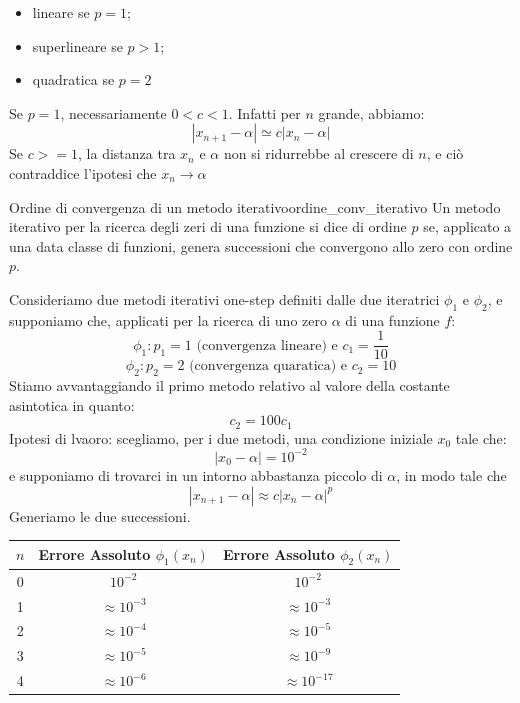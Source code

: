 \documentclass[12pt]{report}
\newcounter{definition}
\newcommand{\nmu}{}
\begin{document}
\begin{itemize}
	\item lineare se $p = 1$;
	\item superlineare se $p > 1$;
	\item quadratica se $p = 2$
\end{itemize}
\begin{note}{}{}
	Se $p = 1$, necessariamente $0 < c < 1$. Infatti per $n$ grande, abbiamo:
	\[
	|x_{n+1}-\alpha| \simeq c|x_n-\alpha|
	\]
	Se $c >=1$, la distanza tra $x_n$ e $\alpha$ non si ridurrebbe al crescere di $n$, e ciò contraddice l'ipotesi che $x_n \to \alpha$
\end{note}
\begin{definition}{\nmu Ordine di convergenza di un metodo iterativo}{ordine_conv_iterativo}
	Un metodo iterativo per la ricerca degli zeri di una funzione si dice di ordine $p$ se, applicato a una data classe di funzioni, genera successioni che convergono allo zero con ordine $p$.
\end{definition}
\begin{example}{}{}
	Consideriamo due metodi iterativi one-step definiti dalle due iteratrici $\phi_1$ e $\phi_2$, e supponiamo che, applicati per la ricerca di uno zero $\alpha$ di una funzione $f$:
	\[
	\phi_1: p_1 =1 \text{ (convergenza lineare) e } c_1 = \frac{1}{10}
	\]
	\[
	\phi_2: p_2 =2 \text{ (convergenza quaratica) e } c_2 = 10
	\]
	Stiamo avvantaggiando il primo metodo relativo al valore della costante asintotica in quanto:
	\[
	c_2 = 100c_1
	\]
	Ipotesi di lvaoro: scegliamo, per i due metodi, una condizione iniziale $x_0$ tale che:
	\[
	|x_0 - \alpha| = 10^{-2}
	\]
	e supponiamo di trovarci in un intorno abbastanza piccolo di $\alpha$, in modo tale che
	\[
	|x_{n+1} -\alpha| \approx c|x_n - \alpha|^p
	\]
	Generiamo le due successioni.
	\begin{center}
		\begin{tabular}{c|c|c}
			$n$ & \textbf{Errore Assoluto} $\phi_1(x_n)$ & \textbf{Errore Assoluto} $\phi_2(x_n)$ \\ \hline
			0 & $10^{-2}$ & $10^{-2}$ \\
			1 & $\approx 10^{-3}$ & $\approx 10^{-3}$ \\
			2 & $\approx 10^{-4}$ & $\approx 10^{-5}$ \\
			3 & $\approx 10^{-5}$ & $\approx 10^{-9}$ \\
			4 & $\approx 10^{-6}$ & $\approx 10^{-17}$ \\
		\end{tabular}
	\end{center}
\end{example}
\end{document}
